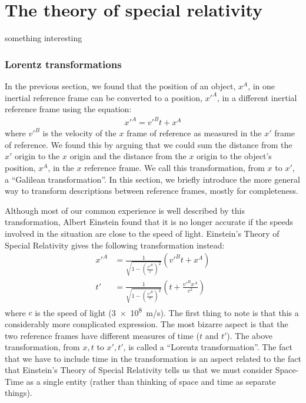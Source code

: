 
\chapter{The theory of special relativity}
\label{chap:specialrelativity}
 \vspace{1cm}
\begin{learningObjectives}
\item something interesting
\end{learningObjectives}

\subsection{Lorentz transformations}
In the previous section, we found that the position of an object, $x^A$, in one inertial reference frame can be converted to a position, $x'^A$, in a different inertial reference frame using the equation:
\begin{align*}
x'^A=v'^Bt+x^A
\end{align*}
where $v'^B$ is the velocity of the $x$ frame of reference as measured in the $x'$ frame of reference. We found this by arguing that we could sum the distance from the $x'$ origin to the $x$ origin and the distance from the $x$ origin to the object's position, $x^A$, in the $x$ reference frame. We call this transformation, from $x$ to $x'$, a ``Galilean transformation''. In this section, we briefly introduce the more general way to transform descriptions between reference frames, mostly for completeness.

Although most of our common experience is well described by this transformation, Albert Einstein found that it is no longer accurate if the speeds involved in the situation are close to the speed of light. Einstein's Theory of Special Relativity gives the following transformation instead:
\begin{align}
\label{eqn:chap3:LorentzTr}
x'^A&=\frac{1}{\sqrt{1-\left(\frac{v'^B}{c}\right)^2}}(v'^Bt+x^A)\\
t'&=\frac{1}{\sqrt{1-\left(\frac{v'^B}{c}\right)^2}}\left(  t+\frac{v'^Bx^A}{c^2} \right)
\end{align}
where $c$ is the speed of light (\SI{3e8}{m/s}). The first thing to note is that this a considerably more complicated expression. The most bizarre aspect is that the two reference frames have different measures of time ($t$ and $t'$). The above transformation, from $x,t$ to $x',t'$, is called a ``Lorentz transformation''. The fact that we have to include time in the transformation is an aspect related to the fact that Einstein's Theory of Special Relativity tells us that we must consider Space-Time as a single entity (rather than thinking of space and time as separate things).

